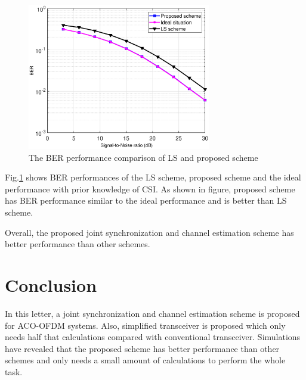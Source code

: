 \documentclass[journal]{IEEEtran}
\begin{document}
    \begin{figure}[!htb]
    	\centering \includegraphics[width=8cm]{channel_estimation_BER.eps}
		\caption{The BER performance comparison of LS and proposed scheme} \label{fig:channel_estimation_BER}
    \end{figure}
	Fig.\ref{fig:channel_estimation_BER} shows BER performances of the LS scheme, proposed scheme and the ideal performance with prior knowledge of CSI. As shown in figure, proposed scheme has BER performance similar to the ideal performance and is better than LS scheme.
	
	Overall, the proposed joint synchronization and channel estimation scheme has better performance than other schemes.

\section{Conclusion}
In this letter, a joint synchronization and channel estimation scheme is proposed for ACO-OFDM systems. Also, simplified transceiver is proposed which only needs half that calculations compared with conventional transceiver. Simulations have revealed that the proposed scheme has better performance than other schemes and only needs a small amount of calculations to perform the whole task.


\scriptsize{}
\end{document}
